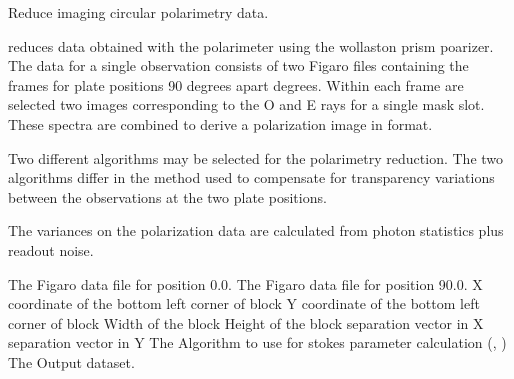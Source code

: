 \begin{manroutinedescription}
        Reduce {} imaging circular polarimetry data.

        {} reduces data obtained with the {} {} polarimeter
        using the wollaston  prism poarizer. The data for a
        single observation consists of two Figaro files containing the
        frames for plate positions 90 degrees apart degrees. Within each
        frame are selected two images corresponding to the O and E rays for
        a single mask slot. These spectra are combined
        to derive a polarization image in {} format.

        Two different algorithms may be selected for the polarimetry
        reduction. The two algorithms differ in the method used to
        compensate for transparency variations between the observations
        at the two plate positions.

        The variances on the polarization data are calculated from photon
        statistics plus readout noise.

\begin{manparametertable}
     The Figaro data file for %
position 0.0.
     The Figaro data file for %
position 90.0.
  X coordinate of the bottom left %
corner of block
  Y coordinate of the bottom left %
corner of block
  Width of the block
  Height of the block
  {} separation vector %
in X
  {} separation vector %
in Y
     The Algorithm to use for %
stokes
                               parameter calculation ({}, {})
  The %
Output dataset.

\end{manparametertable}
\end{manroutinedescription}
